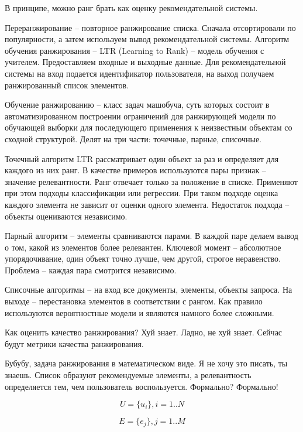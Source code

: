 В принципе, можно ранг брать как оценку рекомендательной системы.

Переранжирование -- повторное ранжирование списка. Сначала отсортировали по популярности, а затем используем вывод рекомендательной системы. Алгоритм обучения ранжирования -- LTR (Learning to Rank) -- модель обучения с учителем. Предоставляем входные и выходные данные. Для рекомендательной системы на вход подается идентификатор пользователя, на выход получаем ранжированный список элементов.

Обучение ранжированию -- класс задач машобуча, суть которых состоит в автоматизированном построении ограничений для ранжирующей модели по обучающей выборки для последующего применения к неизвестным объектам со сходной структурой. Делят на три части: точечные, парные, списочные.

Точечный алгоритм LTR рассматривает один объект за раз и определяет для каждого из них ранг. В качестве примеров используются пары признак -- значение релевантности. Ранг отвечает только за положение в списке. Применяют при этом подходы классификации или регрессии. При таком подходе оценка каждого элемента не зависит от оценки одного элемента. Недостаток подхода -- объекты оцениваются независимо.

Парный алгоритм -- элементы сравниваются парами. В каждой паре делаем вывод о том, какой из элементов более релевантен. Ключевой момент -- абсолютное упорядочивание, один объект точно лучше, чем другой, строгое неравенство. Проблема -- каждая пара смотрится независимо.

Списочные алгоритмы -- на вход все документы, элементы, объекты запроса. На выходе -- перестановка элементов в соответствии с рангом. Как правило используются вероятностные модели и являются намного более сложными. 

Как оценить качество ранжирования? Хуй знает. Ладно, не хуй знает. Сейчас будут метрики качества ранжирования.

Бубубу, задача ранжирования в математическом виде. Я не хочу это писать, ты знаешь. Список образуют рекомендуемые элементы, а релевантность определяется тем, чем пользователь воспользуется. Формально? Формально!

\begin{equation}
    U = \{u_i\}, i = 1..N
\end{equation}

\begin{equation}
    E = \{e_j\}, j = 1..M
\end{equation}

